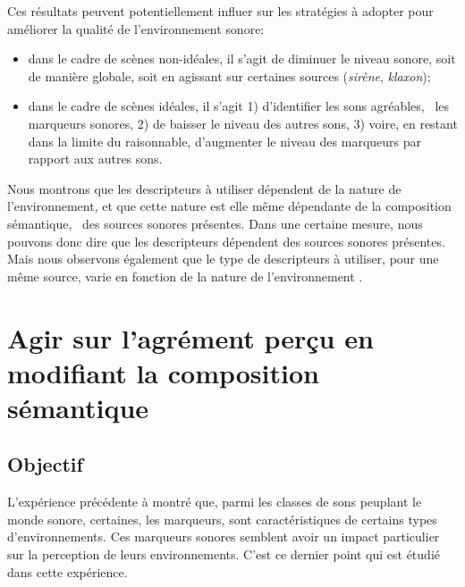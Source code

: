 Ces résultats peuvent potentiellement influer sur les stratégies à adopter pour améliorer la qualité de l’environnement sonore:

\begin{itemize}
\item dans le cadre de scènes non-idéales, il s'agit de diminuer le niveau sonore, soit de manière globale, soit en agissant sur certaines sources (\emph{sirène}, \emph{klaxon});
\item dans le cadre de scènes idéales, il s'agit 1) d'identifier les sons agréables, \ie~les marqueurs sonores, 2) de baisser le niveau des autres sons, 3) voire, en restant dans la limite du raisonnable, d'augmenter le niveau des marqueurs par rapport aux autres sons.
\end{itemize}

Nous montrons que les descripteurs à utiliser dépendent de la nature de l'environnement, et que cette nature est elle même dépendante de la composition sémantique, \ie~des sources sonores présentes. Dans une certaine mesure, nous pouvons donc dire que les descripteurs dépendent des sources sonores présentes. Mais nous observons également que le type de descripteurs à utiliser, pour une même source, varie en fonction de la nature de l'environnement . \\


\section{Agir sur l'agrément perçu en modifiant la composition sémantique}
\label{sec:xp3}

\subsection{Objectif}

L'expérience précédente à montré que, parmi les classes de sons peuplant le monde sonore, certaines, les marqueurs, sont caractéristiques de certains types d'environnements. Ces marqueurs sonores semblent avoir un impact particulier sur la perception de leurs environnements. C'est ce dernier point qui est étudié dans cette expérience.


